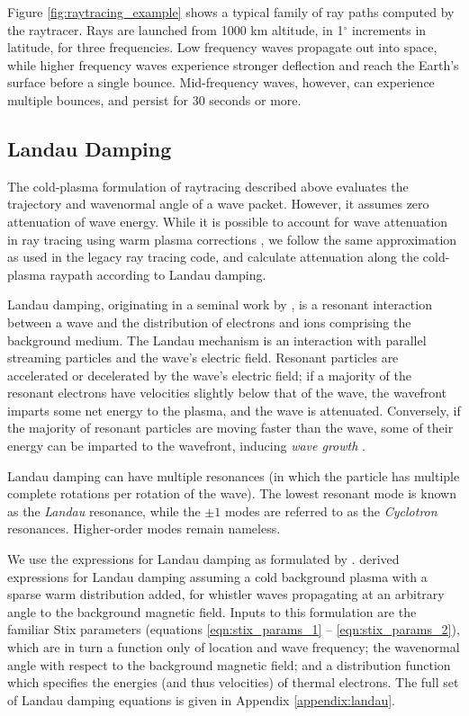 Figure \ref{fig:raytracing_example} shows a typical family of ray paths computed by the raytracer. Rays are launched from 1000 km altitude, in 1$^\circ$ increments in latitude, for three frequencies. Low frequency waves propagate out into space, while higher frequency waves experience stronger deflection and reach the Earth's surface before a single bounce. Mid-frequency waves, however, can experience multiple bounces, and persist for 30 seconds or more.

\subsection{Landau Damping}
\label{section:damping}
The cold-plasma formulation of raytracing described above evaluates the trajectory and wavenormal angle of a wave packet. However, it assumes zero attenuation of wave energy. While it is possible to account for wave attenuation in ray tracing using warm plasma corrections \citep{Sazhin1993, Henyey1980, Maxworth2017}, we follow the same approximation as used in the legacy ray tracing code, and calculate attenuation along the cold-plasma raypath according to Landau damping.

Landau damping, originating in a seminal work by \cite{Landau1946}, is a resonant interaction between a wave and the distribution of electrons and ions comprising the background medium. The Landau mechanism is an interaction with parallel streaming particles and the wave's electric field. Resonant particles are accelerated or decelerated by the wave's electric field; if a majority of the resonant electrons have velocities slightly below that of the wave, the wavefront imparts some net energy to the plasma, and the wave is attenuated. Conversely, if the majority of resonant particles are moving faster than the wave, some of their energy can be imparted to the wavefront, inducing \emph{wave growth} \citep{Chen1983, Kulkarni2009, Harid2015}. 

Landau damping can have multiple resonances (in which the particle has multiple complete rotations per rotation of the wave). The lowest resonant mode is known as the \emph{Landau} resonance, while the $\pm 1$ modes are referred to as the \emph{Cyclotron} resonances. Higher-order modes remain nameless.

We use the expressions for Landau damping as formulated by \cite{Brinca1972}. \citeauthor{Brinca1972} derived expressions for Landau damping assuming a cold background plasma with a sparse warm distribution added, for whistler waves propagating at an arbitrary angle to the background magnetic field. Inputs to this formulation are the familiar Stix parameters (equations \eqref{eqn:stix_params_1} -- \eqref{eqn:stix_params_2}), which are in turn a function only of location and wave frequency; the wavenormal angle with respect to the background magnetic field; and a distribution function which specifies the energies (and thus velocities) of thermal electrons. The full set of Landau damping equations is given in Appendix \ref{appendix:landau}.

